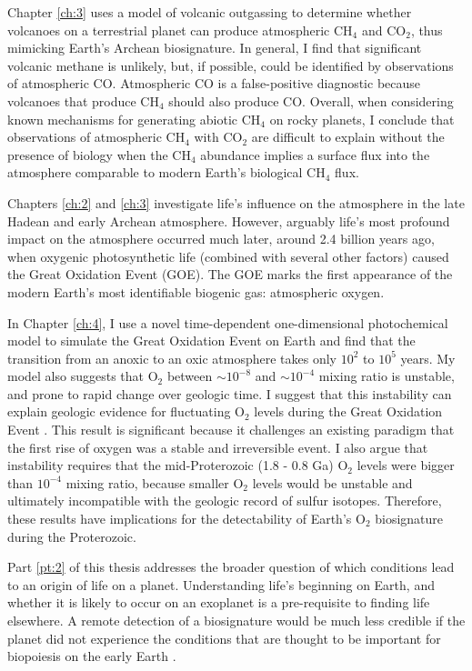 Chapter \ref{ch:3} uses a model of volcanic outgassing to determine whether volcanoes on a terrestrial planet can produce atmospheric CH$_4$ and CO$_2$, thus mimicking Earth's Archean biosignature. In general, I find that significant volcanic methane is unlikely, but, if possible, could be identified by observations of atmospheric CO. Atmospheric CO is a false-positive diagnostic because volcanoes that produce CH$_4$ should also produce CO. Overall, when considering known mechanisms for generating abiotic CH$_4$ on rocky planets, I conclude that observations of atmospheric CH$_4$ with CO$_2$ are difficult to explain without the presence of biology when the CH$_4$ abundance implies a surface flux into the atmosphere comparable to modern Earth's biological CH$_4$ flux.

Chapters \ref{ch:2} and \ref{ch:3} investigate life's influence on the atmosphere in the late Hadean and early Archean atmosphere. However, arguably life's most profound impact on the atmosphere occurred much later, around 2.4 billion years ago, when oxygenic photosynthetic life (combined with several other factors) caused the Great Oxidation Event (GOE). The GOE marks the first appearance of the modern Earth's most identifiable biogenic gas: atmospheric oxygen.

In Chapter \ref{ch:4}, I use a novel time-dependent one-dimensional photochemical model to simulate the Great Oxidation Event on Earth and find that the transition from an anoxic to an oxic atmosphere takes only $10^2$ to $10^5$ years. My model also suggests that O$_2$ between $\sim 10^{-8}$ and $\sim 10^{-4}$ mixing ratio is unstable, and prone to rapid change over geologic time. I suggest that this instability can explain geologic evidence for fluctuating O$_2$ levels during the Great Oxidation Event \citep{Poulton_2021}. This result is significant because it challenges an existing paradigm \citep{Goldblatt_2006} that the first rise of oxygen was a stable and irreversible event. I also argue that instability requires that the mid-Proterozoic (1.8 - 0.8 Ga) O$_2$ levels were bigger than $10^{-4}$ mixing ratio, because smaller O$_2$ levels would be unstable and ultimately incompatible with the geologic record of sulfur isotopes. Therefore, these results have implications for the detectability of Earth's O$_2$ biosignature during the Proterozoic.

Part \ref{pt:2} of this thesis addresses the broader question of which conditions lead to an origin of life on a planet. Understanding life's beginning on Earth, and whether it is likely to occur on an exoplanet is a pre-requisite to finding life elsewhere. A remote detection of a biosignature would be much less credible if the planet did not experience the conditions that are thought to be important for biopoiesis on the early Earth \citep{Catling_2018}.


